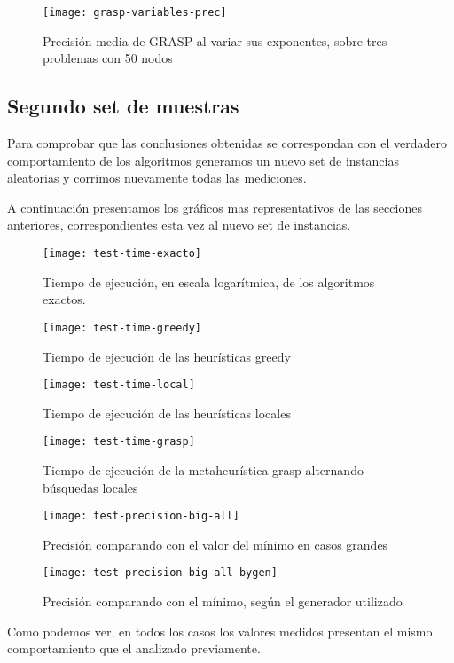 \begin{figure}[H]
    \centering
    \texttt{[image: grasp-variables-prec]}
    \caption{Precisión media de GRASP al variar sus exponentes, sobre tres problemas con 50 nodos}
    \label{fig:grasp-variables-prec}
\end{figure}

\subsection{Segundo set de muestras}

Para comprobar que las conclusiones obtenidas se correspondan con el verdadero comportamiento de los algoritmos
generamos un nuevo set de instancias aleatorias y corrimos nuevamente todas las mediciones.

A continuación presentamos los gráficos mas representativos de las secciones anteriores, correspondientes esta vez
al nuevo set de instancias.

\begin{figure}[H]
    \centering
    \texttt{[image: test-time-exacto]}
    \caption{Tiempo de ejecución, en escala logarítmica, de los algoritmos exactos.}
    \label{fig:test-time-exacto}
\end{figure}

\begin{figure}[H]
    \centering
    \texttt{[image: test-time-greedy]}
    \caption{Tiempo de ejecución de las heurísticas greedy}
    \label{fig:test-time-greedy}
\end{figure}

\begin{figure}[H]
    \centering
    \texttt{[image: test-time-local]}
    \caption{Tiempo de ejecución de las heurísticas locales}
    \label{fig:test-time-local}
\end{figure}

\begin{figure}[H]
    \centering
    \texttt{[image: test-time-grasp]}
    \caption{Tiempo de ejecución de la metaheurística grasp alternando búsquedas locales}
    \label{fig:test-time-grasp}
\end{figure}

\begin{figure}[H]
    \centering
    \texttt{[image: test-precision-big-all]}
    \caption{Precisión comparando con el valor del mínimo en casos grandes}
    \label{fig:test-precision-big-all}
\end{figure}

\begin{figure}[H]
    \centering
    \texttt{[image: test-precision-big-all-bygen]}
    \caption{Precisión comparando con el mínimo, según el generador utilizado}
    \label{fig:test-precision-big-all-bygen}
\end{figure}

Como podemos ver, en todos los casos los valores medidos presentan el mismo comportamiento que el analizado previamente.
